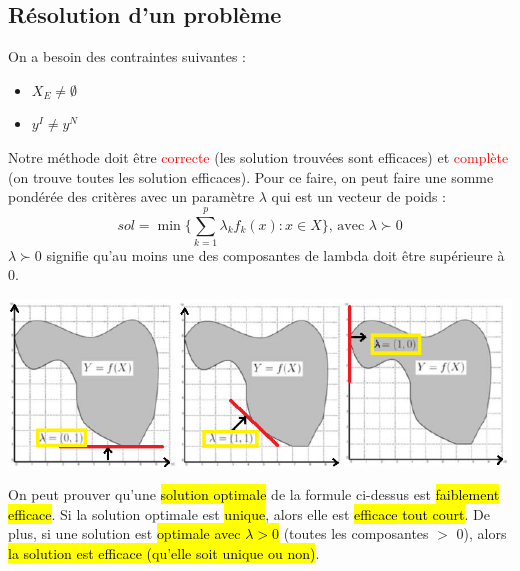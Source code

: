 \documentclass[a4paper, 12pt]{article}
\newcommand{\alinea}{
\hspace*{0.5cm}}
\newcommand{\red}[1]{
	\textcolor{red}{#1}}
\begin{document}
	\subsection{Résolution d'un problème}
		\alinea On a besoin des contraintes suivantes :
		\begin{itemize}
			\setlength\itemsep{0cm}
			\item $X_E \neq \emptyset$
			\item $y^I \neq y^N$
		\end{itemize}
		\alinea Notre méthode doit être \red{correcte} (les solution trouvées sont efficaces) et \red{complète} 
			(on trouve toutes les solution efficaces). Pour ce faire, on peut faire une somme pondérée des critères
			avec un paramètre $\lambda$ qui est un vecteur de poids :
			$$ sol = \min \lbrace \sum\limits^p_{k=1} \lambda_k f_k(x) : x \in X \rbrace\text{, avec } \lambda \succ 0 $$
			$ \lambda \succ 0 $ signifie qu'au moins une des composantes de lambda doit être supérieure à $0$.
		\begin{center}
			\includegraphics[width=5.5in]{Images/lambda}
		\end{center}
		\alinea On peut prouver qu'une \hl{solution optimale} de la formule ci-dessus est \hl{faiblement efficace}. Si la solution optimale
			est \hl{unique}, alors elle est \hl{efficace tout court}. De plus, si une solution est \hl{optimale avec $\lambda > 0$}
			(toutes les composantes $>$ 0), alors \hl{la solution est efficace (qu'elle soit unique ou non)}.
\end{document}
